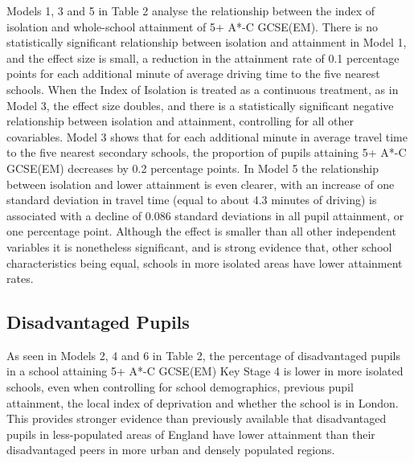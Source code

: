 \documentclass[12pt, a4paper]{article}
\begin{document}
Models 1, 3 and 5 in Table 2 analyse the relationship between the index of isolation and whole-school attainment of 5+ A*-C GCSE(EM). There is no statistically significant relationship between isolation and attainment in Model 1, and the effect size is small, a reduction in the attainment rate of 0.1 percentage points for each additional minute of average driving time to the five nearest schools. When the Index of Isolation is treated as a continuous treatment, as in Model 3, the effect size doubles, and there is a statistically significant negative relationship between isolation and attainment, controlling for all other covariables. Model 3 shows that for each additional minute in average travel time to the five nearest secondary schools, the proportion of pupils attaining 5+ A*-C GCSE(EM) decreases by 0.2 percentage points. In Model 5 the relationship between isolation and lower attainment is even clearer, with an increase of one standard deviation in travel time (equal to about 4.3 minutes of driving) is associated with a decline of 0.086 standard deviations in all pupil attainment, or one percentage point. Although the effect is smaller than all other independent variables it is nonetheless significant, and is strong evidence that, other school characteristics being equal, schools in more isolated areas have lower attainment rates.

\subsection{Disadvantaged Pupils}

As seen in Models 2, 4 and 6 in Table 2, the percentage of disadvantaged pupils in a school attaining 5+ A*-C GCSE(EM) Key Stage 4 is lower in more isolated schools, even when controlling for school demographics, previous pupil attainment, the local index of deprivation and whether the school is in London. This provides stronger evidence than previously available that disadvantaged pupils in less-populated areas of England have lower attainment than their disadvantaged peers in more urban and densely populated regions.
\end{document}
